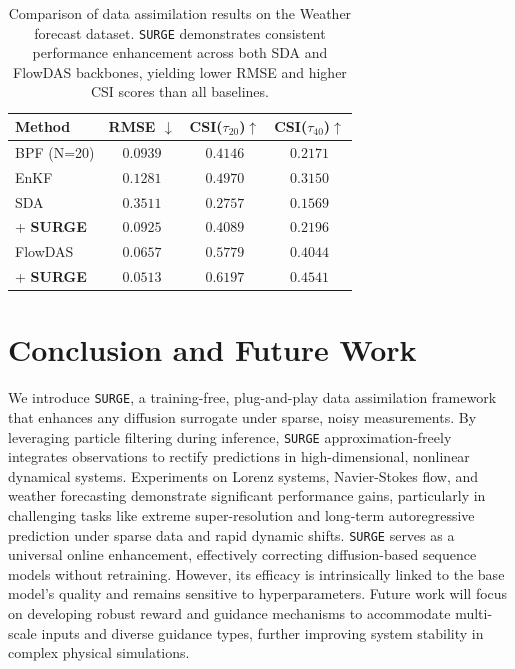 \documentclass{article}
\theoremstyle{plain}
\theoremstyle{definition}
\theoremstyle{remark}
\begin{document}
\begin{table}[t]
\caption{Comparison of data assimilation results on the Weather forecast dataset. \texttt{SURGE} demonstrates consistent performance enhancement across both SDA and FlowDAS backbones, yielding lower RMSE and higher CSI scores than all baselines.}
\label{tab:Weather_results_comparison}
\begin{center}
\begin{small}
\begin{sc}
\begin{tabular}{lccc}
\toprule
Method & RMSE $\downarrow$ & CSI($\tau_{20}$)$\uparrow$ & CSI($\tau_{40}$)$\uparrow$\\
\midrule
BPF (N=20)              & $0.0939$ & $0.4146$ & $0.2171$ \\
EnKF                    & $0.1281$ & $0.4970$ & $0.3150$ \\
SDA                     & $0.3511$ & $0.2757$ & $0.1569$ \\
\quad + \textbf{SURGE}  & $0.0925$ & $0.4089$ & $0.2196$ \\
FlowDAS                 & $0.0657$ & $0.5779$ & $0.4044$ \\
\quad + \textbf{SURGE}  & $\mathbf{0.0513}$ & $\mathbf{0.6197}$ & $\mathbf{0.4541}$ \\
\bottomrule
\end{tabular}
\end{sc}
\end{small}
\end{center}
\vspace{-0.3in}
\end{table}

\section{Conclusion and Future Work}
We introduce \texttt{SURGE}, a training-free, plug-and-play data assimilation framework that enhances any diffusion surrogate under sparse, noisy measurements. By leveraging particle filtering during inference, \texttt{SURGE} approximation-freely integrates observations to rectify predictions in high-dimensional, nonlinear dynamical systems. Experiments on Lorenz systems, Navier-Stokes flow, and weather forecasting demonstrate significant performance gains, particularly in challenging tasks like extreme super-resolution and long-term autoregressive prediction under sparse data and rapid dynamic shifts. \texttt{SURGE} serves as a universal online enhancement, effectively correcting diffusion-based sequence models without retraining. However, its efficacy is intrinsically linked to the base model's quality and remains sensitive to hyperparameters. Future work will focus on developing robust reward and guidance mechanisms to accommodate multi-scale inputs and diverse guidance types, further improving system stability in complex physical simulations.
\end{document}
